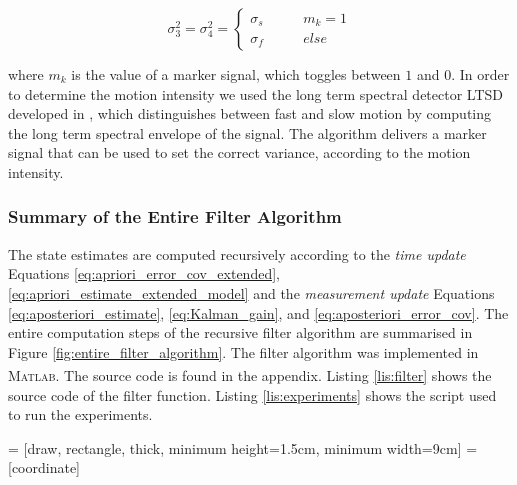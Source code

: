\begin{equation}
  \sigma^2_3 = \sigma^2_4 = \begin{cases}
  	\sigma_s & \qquad m_k = 1 \\
  	\sigma_f & \qquad {else}
  \end{cases}
\end{equation}

\noindent
where $m_k$ is the value of a marker signal, which toggles between $1$ and $0$. In order to determine the motion intensity we used the long term spectral detector \gls{LTSD} developed in \cite{olivares_vicente_gaitwatch_2013}, which distinguishes between fast and slow motion by computing the long term spectral envelope of the signal. The algorithm delivers a marker signal that can be used to set the correct variance, according to the motion intensity.

\subsubsection{Summary of the Entire Filter Algorithm}

The state estimates are computed recursively according to the \emph{time update} Equations \ref{eq:apriori_error_cov_extended}, \ref{eq:apriori_estimate_extended_model} and the \emph{measurement update} Equations \ref{eq:aposteriori_estimate}, \ref{eq:Kalman_gain}, and \ref{eq:aposteriori_error_cov}. The entire computation steps of the recursive filter algorithm are summarised in Figure \ref{fig:entire_filter_algorithm}. The filter algorithm was implemented in \textsc{Matlab}\textsuperscript{\textregistered}. The source code is found in the appendix. Listing \ref{lis:filter} shows the source code of the filter function. Listing \ref{lis:experiments} shows the script used to run the experiments.


 = [draw, rectangle, thick, 
    minimum height=1.5cm, minimum width=9cm]
 = [coordinate]

